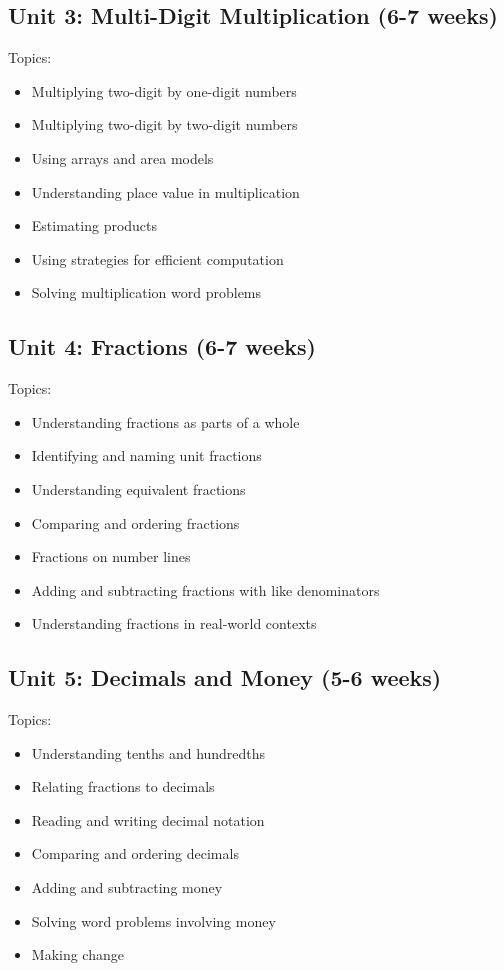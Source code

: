 \documentclass[11pt,letterpaper]{report}
\begin{document}
\subsection{Unit 3: Multi-Digit Multiplication (6-7 weeks)}

Topics:
\begin{itemize}
\item Multiplying two-digit by one-digit numbers
\item Multiplying two-digit by two-digit numbers
\item Using arrays and area models
\item Understanding place value in multiplication
\item Estimating products
\item Using strategies for efficient computation
\item Solving multiplication word problems
\end{itemize}

\subsection{Unit 4: Fractions (6-7 weeks)}

Topics:
\begin{itemize}
\item Understanding fractions as parts of a whole
\item Identifying and naming unit fractions
\item Understanding equivalent fractions
\item Comparing and ordering fractions
\item Fractions on number lines
\item Adding and subtracting fractions with like denominators
\item Understanding fractions in real-world contexts
\end{itemize}

\subsection{Unit 5: Decimals and Money (5-6 weeks)}

Topics:
\begin{itemize}
\item Understanding tenths and hundredths
\item Relating fractions to decimals
\item Reading and writing decimal notation
\item Comparing and ordering decimals
\item Adding and subtracting money
\item Solving word problems involving money
\item Making change
\end{itemize}
\end{document}
